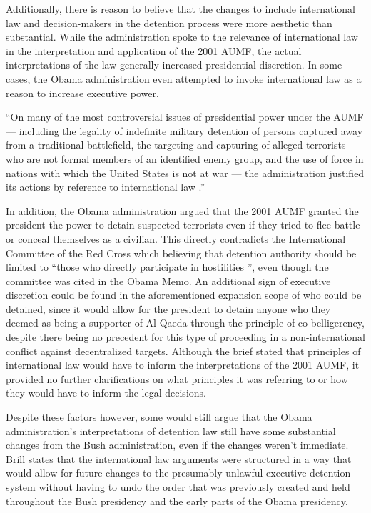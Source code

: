 \documentclass[12pt]{article}
\begin{document}
Additionally, there is reason to believe that the changes to include international law and decision-makers in the detention process were more aesthetic than substantial.
While the administration spoke to the relevance of international law in the interpretation and application of the 2001 AUMF, the actual interpretations of the law generally increased presidential discretion.
In some cases, the Obama administration even attempted to invoke international law as a reason to increase executive power.

\begin{displayquote}
``On many of the most controversial issues of presidential power under the AUMF — including the legality of indefinite military detention of persons captured away from a traditional battlefield, the targeting and capturing of alleged terrorists who are not formal members of an identified enemy group, and the use of force in nations with which the United States is not at war — the administration justified its actions by reference to international law \autocite[639]{bradley2016}.''
\end{displayquote}

\noindent
In addition, the Obama administration argued that the 2001 AUMF granted the president the power to detain suspected terrorists even if they tried to flee battle or conceal themselves as a civilian.
This directly contradicts the International Committee of the Red Cross which believing that detention authority should be limited to ``those who directly participate in hostilities \autocite[639]{bradley2016}'', even though the committee was cited in the Obama Memo.
An additional sign of executive discretion could be found in the aforementioned expansion scope of who could be detained, since it would allow for the president to detain anyone who they deemed as being a supporter of Al Qaeda through the principle of co-belligerency, despite there being no precedent for this type of proceeding in a non-international conflict against decentralized targets.
Although the brief stated that principles of international law would have to inform the interpretations of the 2001 AUMF, it provided no further clarifications on what principles it was referring to or how they would have to inform the legal decisions. 

Despite these factors however, some would still argue that the Obama administration's interpretations of detention law still have some substantial changes from the Bush administration, even if the changes weren't immediate.
Brill states that the international law arguments were structured in a way that would allow for future changes to the presumably unlawful executive detention system without having to undo the order that was previously created and held throughout the Bush presidency and the early parts of the Obama presidency.
\end{document}
